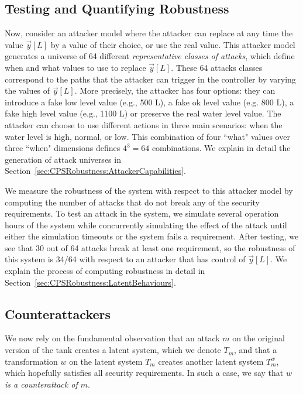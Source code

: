 \subsection*{Testing and Quantifying Robustness}
Now, consider an attacker model where the attacker can replace at any time the value $\vec{y}[L]$ by a value of their choice, or use the real value. This attacker model generates a universe of 64 different \emph{representative classes of attacks}, which define when and what values to use to replace $\vec{y}[L]$. These 64 attacks classes correspond to the paths that the attacker can trigger in the controller by varying the values of $\vec{y}[L]$.  More precisely, the attacker has four options: they can introduce a fake low level value (e.g., 500 L), a fake ok level value (e.g. 800 L), a fake high level value (e.g., 1100 L) or preserve the real water level value. The attacker can choose to use different actions in three main scenarios: when the water level is high, normal, or low. This combination of four ``what" values over three ``when" dimensions defines $4^3=64$ combinations. We explain in detail the generation of attack universes in Section~\ref{sec:CPSRobustness:AttackerCapabilities}. 

We measure the robustness of the system with respect to this attacker model by computing the number of attacks that do not break any of the security requirements. To test an attack in the system, we simulate several operation hours of the system while concurrently simulating the effect of the attack until either the simulation timeouts or the system fails a requirement. After testing, we see that 30 out of 64 attacks break at least one requirement, so the robustness of this system is 34/64 with respect to an attacker that has control of $\vec{y}[L]$. We explain the process of computing robustness in detail in Section~\ref{sec:CPSRobustness:LatentBehaviours}.

\subsection*{Counterattackers}
We now rely on the fundamental observation that an attack $m$ on the original version of the tank creates a latent system, which we denote $T_m$, and that a transformation $w$ on the latent system $T_m$ creates another latent system $T^w_m$, which hopefully satisfies all security requirements. In such a case, we say that \emph{$w$ is a counterattack of $m$}. 

